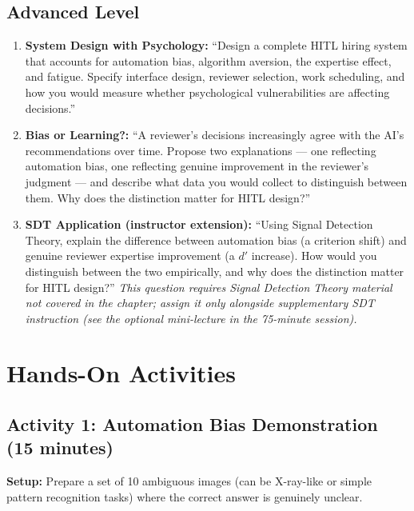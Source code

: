 \subsection{Advanced Level}

\begin{enumerate}
    \item \textbf{System Design with Psychology:} ``Design a complete HITL hiring system that accounts for automation bias, algorithm aversion, the expertise effect, and fatigue. Specify interface design, reviewer selection, work scheduling, and how you would measure whether psychological vulnerabilities are affecting decisions.''

    \item \textbf{Bias or Learning?:} ``A reviewer's decisions increasingly agree with the AI's recommendations over time. Propose two explanations --- one reflecting automation bias, one reflecting genuine improvement in the reviewer's judgment --- and describe what data you would collect to distinguish between them. Why does the distinction matter for HITL design?''

    \item \textbf{SDT Application (instructor extension):} ``Using Signal Detection Theory, explain the difference between automation bias (a criterion shift) and genuine reviewer expertise improvement (a $d'$ increase). How would you distinguish between the two empirically, and why does the distinction matter for HITL design?'' \emph{This question requires Signal Detection Theory material not covered in the chapter; assign it only alongside supplementary SDT instruction (see the optional mini-lecture in the 75-minute session).}
\end{enumerate}

\section{Hands-On Activities}

\subsection{Activity 1: Automation Bias Demonstration (15 minutes)}

\textbf{Setup:} Prepare a set of 10 ambiguous images (can be X-ray-like or simple pattern recognition tasks) where the correct answer is genuinely unclear.

